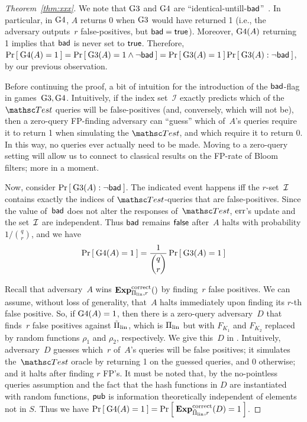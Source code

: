 \begin{proof}[Theorem~\ref{thm:xxx}]
We note that $\text{G3}$ and $\text{G4}$ are
``identical-untill-$\mathsf{bad}$''~\cite{BeRo-gameplaying}.  In particular,
in $\text{G4}$, $A$ returns 0 when $\text{G3}$ would have returned 1 (i.e.,
the adversary outputs~$r$ false-positives, but $\mathsf{bad}=\mathsf{true}$).  
Moreover,  $\text{G4}(A)$ returning 1 implies that $\mathsf{bad}$ is never set to $\mathsf{true}$. Therefore,
$\Pr\left[\: \text{G4}(A)=1 \:\right] = \Pr\left[\: \text{G3}(A)=1 \wedge \neg\mathsf{bad} \:\right] =
\Pr\left[\: \text{G3}(A)=1 \:\right] \Pr\left[\: \text{G3}(A) : \neg\mathsf{bad} \:\right]$, by our previous observation.

Before continuing the proof, a bit of intuition for the introduction
of the $\mathsf{bad}$-flag in games~$\text{G3},\text{G4}$.   Intuitively, if the index
set~$\mathcal{I}$ exactly predicts which of the $\Test$ queries will be
false-positives (and, conversely, which will not be), then a
zero-query FP-finding adversary can ``guess'' which of~$A$'s queries require it
to return 1 when simulating the $\Test$, and which require it to
return 0.  In this way, no queries ever actually need to be made.
Moving to a zero-query setting will allow us to connect to classical
results on the FP-rate of Bloom filters; more in a moment. 

Now, consider $\Pr\left[\: \text{G3}(A) : \neg\mathsf{bad} \:\right]$.  The indicated event
happens iff the $r$-set~${\cal I}$ contains exactly the indices of
$\Test$-queries that are false-positives.  Since the value
of~$\mathsf{bad}$ does not alter the responses of~$\Test$, $\mathrm{err}$'s update
and the set~${\cal I}$ are independent.
Thus $\mathsf{bad}$ remains $\mathsf{false}$ after~$A$ halts with probability
$1/\binom{q}{r}$, and we have 
\begin{equation*}
\Pr\left[\: \text{G4}(A)=1 \:\right] = \frac{1}{\dbinom{q}{r}}\Pr\left[\: \text{G3}(A)=1 \:\right]
\end{equation*}

Recall that adversary~$A$ wins $\mathrm{\mathbf{Exp}}^{\mathrm{correct}}_{\Pi_{\mathrm{lin}},r}()$ by finding~$r$ false positives. We can assume, without loss of generality,  that~$A$ halts immediately upon finding its $r$-th false positive. %
%
So, if $\text{G4}(A)=1$, then there is a zero-query adversary~$D$ that finds~$r$ false positives against $\tilde{\Pi}_{\mathrm{lin}}$, which is $\Pi_{\mathrm{lin}}$ but with $F_{K_1}$ and $F_{K_2}$ replaced by random functions $\rho_1$ and $\rho_2$, respectively.  We give this~$D$ in . Intuitively, adversary~$D$ guesses which~$r$ of~$A$'s queries will be false positives; it simulates the~$\Test$ oracle by returning 1 on the guessed queries, and 0 otherwise; and it halts after finding $r$ FP's. It must be noted that, by the no-pointless queries assumption and the fact that the hash functions in $D$ are instantiated with random functions, ${\sf pub}$ is information theoretically independent of elements not in $S$. Thus we have
$\Pr\left[\: \text{G4}(A)=1 \:\right] =\Pr\left[\: \mathrm{\mathbf{Exp}}^{\mathrm{correct}}_{\tilde{\Pi}_{\mathrm{lin}},r}(D) = 1 \:\right]$.


\end{proof}
